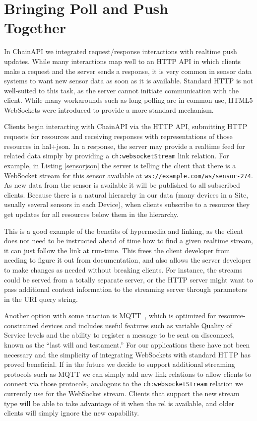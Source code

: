\documentclass{acm_proc_article-sp}
\begin{document}
\section{Bringing Poll and Push\\ Together}

In ChainAPI we integrated request/response interactions with realtime push
updates. While many interactions map well to an HTTP API in which clients make
a request and the server sends a response, it is very common in sensor data
systems to want new sensor data as soon as it is available.  Standard HTTP is
not well-suited to this task, as the server cannot initiate communication with
the client. While many workarounds such as long-polling are in common use,
HTML5 WebSockets were introduced to provide a more standard mechanism.

Clients begin interacting with ChainAPI via the HTTP API, submitting HTTP
requests for resources and receiving responses with representations of those
resources in hal+json. In a response, the server may provide a realtime feed
for related data simply by providing a \texttt{ch:websocketStream} link
relation. For example, in Listing \ref{sensorjson} the server is telling the
client that there is a WebSocket stream for this sensor available at
\texttt{ws://example.com/ws/sensor-274}. As new data from the sensor is
available it will be published to all subscribed clients. Because there is a
natural hierarchy in our data (many devices in a Site, usually several sensors
in each Device), when clients subscribe to a resource they get updates for all
resources below them in the hierarchy.

This is a good example of the benefits of hypermedia and linking, as the client
does not need to be instructed ahead of time how to find a given realtime
stream, it can just follow the link at run-time. This frees the client
developer from needing to figure it out from documentation, and also allows the
server developer to make changes as needed without breaking clients. For
instance, the streams could be served from a totally separate server, or the
HTTP server might want to pass additional context information to the streaming
server through parameters in the URI query string.

Another option with some traction is MQTT~\cite{collina2012}, which is
optimized for resource-constrained devices and includes useful features such as
variable Quality of Service levels and the ability to register a message to be
sent on disconnect, known as the ``last will and testament.'' For our
applications these have not been necessary and the simplicity of integrating
WebSockets with standard HTTP has proved beneficial. If in the future we decide
to support additional streaming protocols such as MQTT we can simply add new
link relations to allow clients to connect via those protocols, analogous to
the \texttt{ch:websocketStream} relation we currently use for the WebSocket
stream. Clients that support the new stream type will be able to take advantage
of it when the rel is available, and older clients will simply ignore the new
capability.
\end{document}

